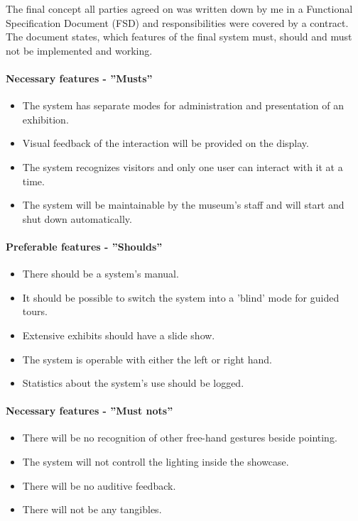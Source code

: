 The final concept all parties agreed on was written down by me in a Functional Specification Document (\ac{FSD}) and responsibilities were covered by a contract. The document states, which features of the final system must, should and must not be implemented and working.

\paragraph{Necessary features - ''Musts''}
\begin{itemize}
	\item The system has separate modes for administration and presentation of an exhibition.
	\item Visual feedback of the interaction will be provided on the display.
	\item The system recognizes visitors and only one user can interact with it at a time.
	\item The system will be maintainable by the museum's staff and will start and shut down automatically.
\end{itemize}

\paragraph{Preferable features - ''Shoulds''}
\begin{itemize}
	\item There should be a system's manual.
	\item It should be possible to switch the system into a 'blind' mode for guided tours.
	\item Extensive exhibits should have a slide show.
	\item The system is operable with either the left or right hand.
	\item Statistics about the system's use should be logged.
\end{itemize}

\paragraph{Necessary features - ''Must nots''}
\begin{itemize}
	\item There will be no recognition of other free-hand gestures beside pointing.
	\item The system will not controll the lighting inside the showcase.
	\item There will be no auditive feedback.
	\item There will not be any tangibles.
\end{itemize}

